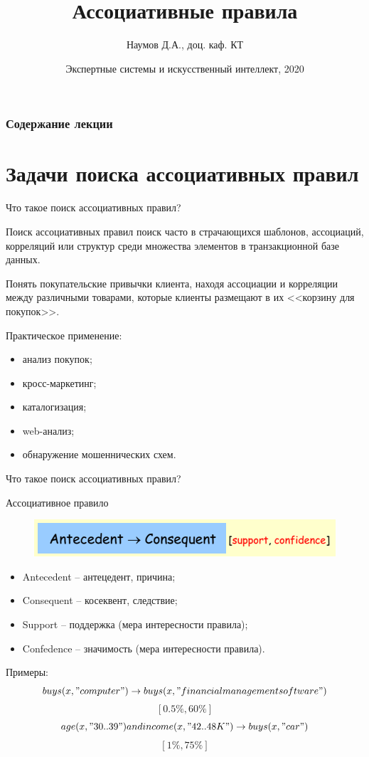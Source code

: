 \documentclass{beamer}
\title[Artifical Intelligence]{Ассоциативные правила}
\author{Наумов Д.А., доц. каф. КТ}
\date[22.11.2020] {Экспертные системы и искусственный интеллект, 2020}
\begin{document}
\begin{frame}
  \titlepage
\end{frame}
  
\begin{frame}
  \frametitle{Содержание лекции}
  \tableofcontents  
\end{frame}

\section{Задачи поиска ассоциативных правил}

\begin{frame}{Что такое поиск ассоциативных правил?}
	\begin{block}{Поиск ассоциативных правил}
		поиск часто в страчающихся шаблонов, ассоциаций, корреляций или структур среди множества элементов в транзакционной базе данных.
	\end{block}
	Понять покупательские привычки клиента, находя ассоциации и корреляции между различными товарами, которые клиенты размещают в их <<корзину для покупок>>. 

	Практическое применение:
	\begin{itemize}
		\item анализ покупок;
		\item кросс-маркетинг;
		\item каталогизация;
		\item web-анализ;
		\item обнаружение мошеннических схем.
	\end{itemize} 
\end{frame}

\begin{frame}{Что такое поиск ассоциативных правил?}
	\begin{block}{Ассоциативное правило}
		\begin{figure}[h]
			\centering
			\includegraphics[scale=0.75]{images/lec08-pic01.png}
		\end{figure}
	\end{block}
	\begin{itemize}
		\item Antecedent -- антецедент, причина;
		\item Consequent -- косеквент, следствие;
		\item Support -- поддержка (мера интересности правила);
		\item Confedence -- значимость (мера интересности правила).
	\end{itemize} 
	Примеры:
		\[buys(x, "computer") \rightarrow buys(x, "financial management software")\]
		\[[0.5\%, 60\%]\]
		\[age(x, "30..39") and income(x, "42..48K") \rightarrow buys(x, "car")\]
		\[[1\%,75\%]\]
\end{frame}
\end{document}
